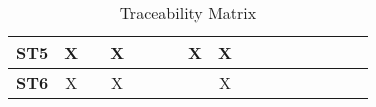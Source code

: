 \documentclass[12pt]{article}
\begin{document}
\begin{table}[H]
\begin{adjustwidth}{-0.1in}{-1in}
{\begin{tabular}{c|c|c|c|c|c|c|c|c|c|c|c|c|c|c|c|c|}
\multicolumn{1}{|l|}{\textbf{ST5}}   &      X       &              &       X      &              &              &              &       X      &       X      &              &              &              &              &              &              &              &               \\ \hline
\multicolumn{1}{|l|}{\textbf{ST6}}   &      X       &              &       X      &              &              &              &              &       X      &              &              &              &              &              &              &              &               \\ \hline

\end{tabular}

}
\caption{Traceability Matrix}
    \label{tab:matrix1}
\end{adjustwidth}
\end{table}
\end{document}
